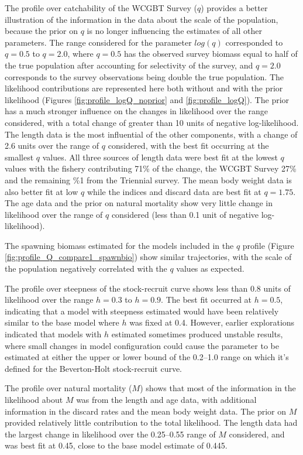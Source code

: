 \documentclass[12pt,]{article}
\begin{document}
The profile over catchability of the WCGBT Survey (\(q\)) provides a
better illustration of the information in the data about the scale of
the population, because the prior on \(q\) is no longer influencing the
estimates of all other parameters. The range considered for the
parameter \(log(q)\) corresponded to \(q = 0.5\) to \(q = 2.0\), where
\(q = 0.5\) has the observed survey biomass equal to half of the true
population after accounting for selectivity of the survey, and
\(q = 2.0\) corresponds to the survey observations being double the true
population. The likelihood contributions are represented here both
without and with the prior likelihood (Figures
\ref{fig:profile_logQ_noprior} and \ref{fig:profile_logQ}). The prior
has a much stronger influence on the changes in likelihood over the
range considered, with a total change of greater than 10 units of
negative log-likelihood. The length data is the most influential of the
other components, with a change of 2.6 units over the range of \(q\)
considered, with the best fit occurring at the smallest \(q\) values.
All three sources of length data were best fit at the lowest \(q\)
values with the fishery contributing 71\% of the change, the WCGBT
Survey 27\% and the remaining \%1 from the Triennial survey. The mean
body weight data is also better fit at low \(q\) while the indices and
discard data are best fit at \(q = 1.75\). The age data and the prior on
natural mortality show very little change in likelihood over the range
of \(q\) considered (less than 0.1 unit of negative log-likelihood).

The spawning biomass estimated for the models included in the \(q\)
profile (Figure \ref{fig:profile_Q_compare1_spawnbio}) show similar
trajectories, with the scale of the population negatively correlated
with the \(q\) values as expected.

The profile over steepness of the stock-recruit curve shows less than
0.8 units of likelihood over the range \(h = 0.3\) to \(h = 0.9\). The
best fit occurred at \(h = 0.5\), indicating that a model with steepness
estimated would have been relatively similar to the base model where
\(h\) was fixed at 0.4. However, earlier explorations indicated that
models with \(h\) estimated sometimes produced unstable results, where
small changes in model configuration could cause the parameter to be
estimated at either the upper or lower bound of the 0.2--1.0 range on
which it's defined for the Beverton-Holt stock-recruit curve.

The profile over natural mortality (\(M\)) shows that most of the
information in the likelihood about \(M\) was from the length and age
data, with additional information in the discard rates and the mean body
weight data. The prior on \(M\) provided relatively little contribution
to the total likelihood. The length data had the largest change in
likelihood over the 0.25--0.55 range of \(M\) considered, and was best
fit at 0.45, close to the base model estimate of 0.445.
\end{document}
